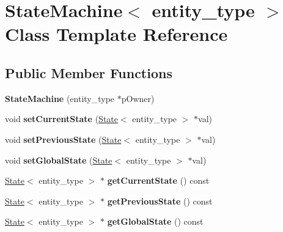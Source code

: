 \hypertarget{class_state_machine}{}\section{State\+Machine$<$ entity\+\_\+type $>$ Class Template Reference}
\label{class_state_machine}
\subsection*{Public Member Functions}
\begin{DoxyCompactItemize}
\item 
\hypertarget{class_state_machine_a336270462a6e76ccbbeab7c3b2f7e23d}{}{\bfseries State\+Machine} (entity\+\_\+type $\ast$p\+Owner)\label{class_state_machine_a336270462a6e76ccbbeab7c3b2f7e23d}

\item 
\hypertarget{class_state_machine_ad09b9f4653c64557ef6d9dc0e306928d}{}void {\bfseries set\+Current\+State} (\hyperlink{class_state}{State}$<$ entity\+\_\+type $>$ $\ast$val)\label{class_state_machine_ad09b9f4653c64557ef6d9dc0e306928d}

\item 
\hypertarget{class_state_machine_aee89a494cfe89298ae6d2501e01311f2}{}void {\bfseries set\+Previous\+State} (\hyperlink{class_state}{State}$<$ entity\+\_\+type $>$ $\ast$val)\label{class_state_machine_aee89a494cfe89298ae6d2501e01311f2}

\item 
\hypertarget{class_state_machine_ad43d3a3bdfc80782ae70b4733f47062c}{}void {\bfseries set\+Global\+State} (\hyperlink{class_state}{State}$<$ entity\+\_\+type $>$ $\ast$val)\label{class_state_machine_ad43d3a3bdfc80782ae70b4733f47062c}

\item 
\hypertarget{class_state_machine_a518dfc4310fad8d96e27a716207dbceb}{}\hyperlink{class_state}{State}$<$ entity\+\_\+type $>$ $\ast$ {\bfseries get\+Current\+State} () const \label{class_state_machine_a518dfc4310fad8d96e27a716207dbceb}

\item 
\hypertarget{class_state_machine_ad6e2eeeb9c91ef21508c80cd9db10f59}{}\hyperlink{class_state}{State}$<$ entity\+\_\+type $>$ $\ast$ {\bfseries get\+Previous\+State} () const \label{class_state_machine_ad6e2eeeb9c91ef21508c80cd9db10f59}

\item 
\hypertarget{class_state_machine_a5067c97c56b065e3e52ba8b8e3ed989c}{}\hyperlink{class_state}{State}$<$ entity\+\_\+type $>$ $\ast$ {\bfseries get\+Global\+State} () const \label{class_state_machine_a5067c97c56b065e3e52ba8b8e3ed989c}


\end{DoxyCompactItemize}
